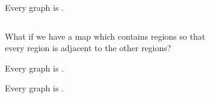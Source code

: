 \begin{frame}{}
  \begin{theorem}
    Every   graph is .
  \end{theorem}

  \begin{columns}
  \end{columns}

  \begin{center}
    What if we have a map which contains  regions so that \\[5pt]
    every region is adjacent to the other  regions?
  \end{center}

  \vspace{0.30cm}
\end{frame}

\begin{frame}{}
  \begin{theorem}
    Every   graph is .
  \end{theorem}

  \pause
  \vspace{1.50cm}
  \begin{theorem}
    Every   graph is .
  \end{theorem}
\end{frame}
